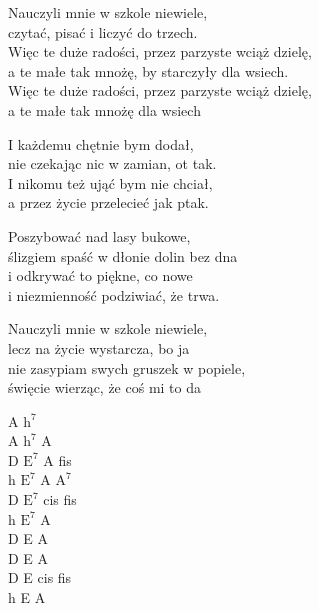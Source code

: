\begin{text}
    Nauczyli mnie w szkole niewiele,\\
    czytać, pisać i liczyć do trzech.\\
    Więc te duże radości, przez parzyste wciąż dzielę,\\
    a te małe tak mnożę, by starczyły dla wsiech.\\
    Więc te duże radości, przez parzyste wciąż dzielę,\\
    a te małe tak mnożę dla wsiech

    I każdemu chętnie bym dodał,\\
    nie czekając nic w zamian, ot tak.\\
    I nikomu też ująć bym nie chciał,\\
    a przez życie przelecieć jak ptak.

    Poszybować nad lasy bukowe,\\
    ślizgiem spaść w dłonie dolin bez dna\\
    i odkrywać to piękne, co nowe\\
    i niezmienność podziwiać, że trwa.

    Nauczyli mnie w szkole niewiele,\\
    lecz na życie wystarcza, bo ja\\
    nie zasypiam swych gruszek w popiele,\\
    święcie wierząc, że coś mi to da
\end{text}
\begin{chord}
    A $\mathrm{h^{7}}$\\
    A $\mathrm{h^{7}}$ A\\
    D $\mathrm{E^{7}}$ A fis\\
    h $\mathrm{E^{7}}$ A $\mathrm{A^{7}}$\\
    D $\mathrm{E^{7}}$ cis fis\\
    h $\mathrm{E^{7}}$ A\\

    \hfill\break
    \hfill\break
    \hfill\break
    \hfill\break
    \hfill\break
    D E A\\
    D E A\\
    D E cis fis\\
    h E A
\end{chord}
